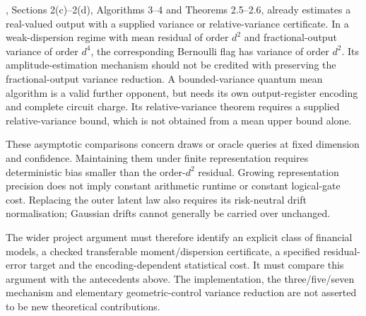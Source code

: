 \citet{montanaro}, Sections 2(c)–2(d), Algorithms 3–4 and Theorems 2.5–2.6, already estimates a real-valued output with a supplied variance or relative-variance certificate. In a weak-dispersion regime with mean residual of order \(d^2\) and fractional-output variance of order \(d^4\), the corresponding Bernoulli flag has variance of order \(d^2\). Its amplitude-estimation mechanism should not be credited with preserving the fractional-output variance reduction. A bounded-variance quantum mean algorithm is a valid further opponent, but needs its own output-register encoding and complete circuit charge. Its relative-variance theorem requires a supplied relative-variance bound, which is not obtained from a mean upper bound alone.

These asymptotic comparisons concern draws or oracle queries at fixed dimension and confidence. Maintaining them under finite representation requires deterministic bias smaller than the order-\(d^2\) residual. Growing representation precision does not imply constant arithmetic runtime or constant logical-gate cost. Replacing the outer latent law also requires its risk-neutral drift normalisation; Gaussian drifts cannot generally be carried over unchanged.

The wider project argument must therefore identify an explicit class of financial models, a checked transferable moment/dispersion certificate, a specified residual-error target and the encoding-dependent statistical cost. It must compare this argument with the antecedents above. The implementation, the three/five/seven mechanism and elementary geometric-control variance reduction are not asserted to be new theoretical contributions.

